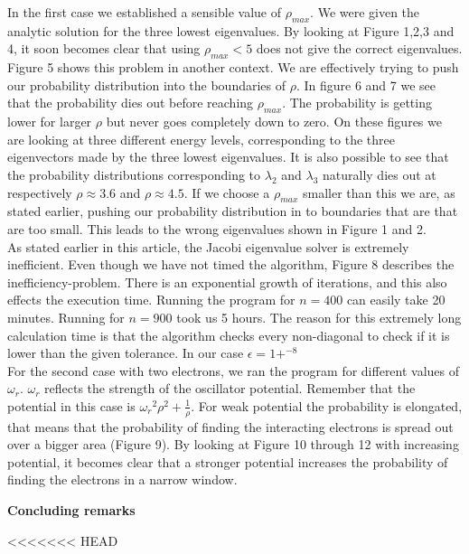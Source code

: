 \documentclass[10pt,a4paper]{article}
\begin{document}
\noindent In the first case we established a sensible value of ${\rho}_{max}$. We were given the analytic solution for the three lowest eigenvalues. By looking at Figure 1,2,3 and 4, it soon becomes clear that using ${\rho}_{max}<5$ does not give the correct eigenvalues. Figure 5 shows this problem in another context. We are effectively trying to push our probability distribution into the boundaries of $\rho$. In figure 6 and 7 we see that the probability dies out before reaching ${\rho}_{max}$. The probability is getting lower for larger $\rho$ but never goes completely down to zero. On these figures we are looking at three different energy levels, corresponding to the three eigenvectors made by the three lowest eigenvalues. It is also possible to see that the probability distributions corresponding to $\lambda_2$ and $\lambda_3$ naturally dies out at respectively $\rho \approx 3.6$ and $\rho \approx 4.5$. If we choose a ${\rho}_{max}$ smaller than this we are, as stated earlier, pushing our probability distribution in to boundaries that are that are too small. This leads to the wrong eigenvalues shown in Figure 1 and 2.\\ 

\noindent As stated earlier in this article, the Jacobi eigenvalue solver is extremely inefficient. Even though we have not timed the algorithm, Figure 8 describes the inefficiency-problem. There is an exponential growth of iterations, and this also effects the execution time. Running the program for $n=400$ can easily take 20 minutes. Running for $n=900$ took us 5 hours. The reason for this extremely long calculation time is that the algorithm checks every non-diagonal to check if it is lower than the given tolerance. In our case $\epsilon=1+^{-8}$\\

\noindent For the second case with two electrons, we ran the program for different values of $\omega_r$. $\omega_r$ reflects the strength of the oscillator potential. Remember that the potential in this case is ${\omega_r}^2\rho^2 + \frac{1}{\rho}$. For weak potential the probability is elongated, that means that the probability of finding the interacting electrons is spread out over a bigger area (Figure 9). By looking at Figure 10 through 12 with increasing potential, it becomes clear that a stronger potential increases the probability of finding the electrons in a narrow window. 




\newpage
\begin{center}
{\LARGE\bf Concluding remarks}
\end{center}
<<<<<<< HEAD
\end{document}
